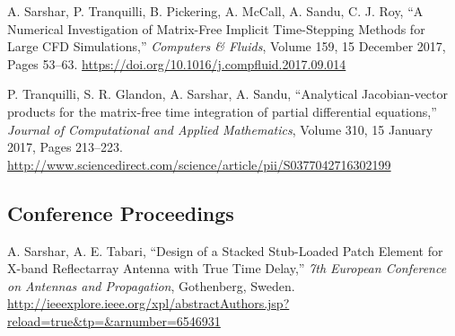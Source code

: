 \documentclass[11pt,letterpaper]{report}
\newcommand{\paperinfo}[5]{
    \tab{}
    #1, %
    \enquote{#2,} %
    \textit{#3}, %
    #4. %
    \href{#5}{#5} %
}
\begin{document}
\begin{tablist}
    \item[2017] \paperinfo{A. Sarshar, P. Tranquilli, B. Pickering, A. McCall, A. Sandu, C. J. Roy}
        {A Numerical Investigation of Matrix-Free Implicit Time-Stepping Methods for Large CFD Simulations}
        {Computers \& Fluids}{Volume 159, 15 December 2017, Pages 53--63}
        {https://doi.org/10.1016/j.compfluid.2017.09.014}

    \item[2017] \paperinfo{P. Tranquilli, S. R. Glandon, A. Sarshar, A. Sandu}
        {Analytical Jacobian-vector products for the matrix-free time integration of partial differential equations}
        {Journal of Computational and Applied Mathematics}{Volume 310, 15 January 2017, Pages 213--223}
        {http://www.sciencedirect.com/science/article/pii/S0377042716302199}

    \end{tablist}







    \subsection*{Conference Proceedings}

    \begin{tablist}
    
    \item[2016] \paperinfo{A. Sarshar, A. E. Tabari}
    {Design of a Stacked Stub-Loaded Patch Element for X-band Reflectarray Antenna with True Time Delay}
    {7th European Conference on Antennas and Propagation}
    {Gothenberg, Sweden}
    {http://ieeexplore.ieee.org/xpl/abstractAuthors.jsp?reload=true\&tp=\&arnumber=6546931}

    \end{tablist}
\end{document}
